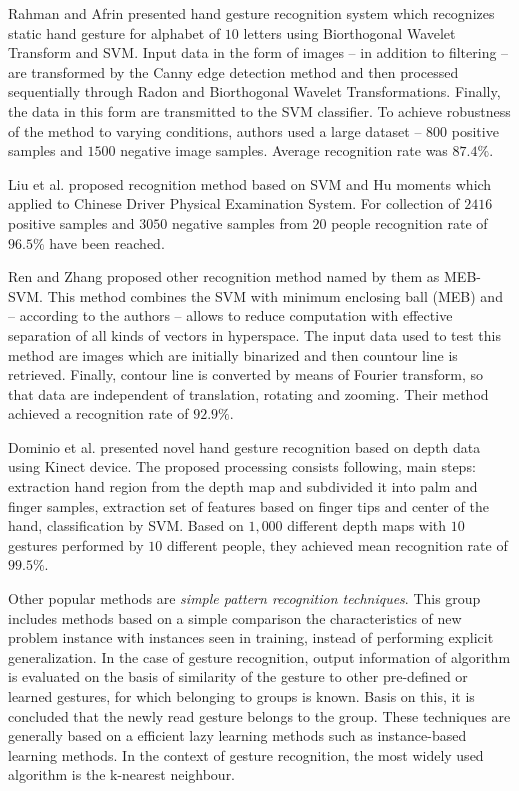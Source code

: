 Rahman and Afrin \cite{RahmanHand} presented hand gesture recognition system which recognizes static hand gesture for alphabet of $10$ letters using Biorthogonal Wavelet Transform and SVM. Input data in the form of images -- in addition to filtering -- are transformed by the Canny edge detection method and then processed sequentially through Radon and Biorthogonal Wavelet Transformations. Finally, the data in this form are transmitted to the SVM classifier. To achieve robustness of the method to varying conditions, authors used a large dataset -- $800$ positive samples and $1500$ negative image samples. Average recognition rate was $87.4\%$.

Liu et al. \cite{LiuStatic} proposed recognition method based on SVM and Hu moments which applied to Chinese Driver Physical Examination System. For collection of $2416$ positive samples and $3050$ negative samples from $20$ people recognition rate of $96.5\%$ have been reached.

Ren and Zhang \cite{RenMEBSVM} proposed other recognition method named by them as MEB-SVM. This method combines the SVM with minimum enclosing ball (MEB) and -- according to the authors -- allows to reduce computation with effective separation of all kinds of vectors in hyperspace. The input data used to test this method are images which are initially binarized and then countour line is retrieved. Finally, contour line is converted by means of Fourier transform, so that data are independent of translation, rotating and zooming. Their method achieved a recognition rate of $92.9\%$.


Dominio et al. \cite{Dominio:2013:HGR:2510650.2510651} presented novel hand gesture recognition based on depth data using Kinect device. The proposed processing consists following, main steps: extraction hand region from the depth map and subdivided it into palm and finger samples, extraction set of features based on finger tips and center of the hand, classification by SVM. Based on $1,000$ different depth maps with $10$ gestures performed by $10$ different people, they achieved mean recognition rate of $99.5\%$.

Other popular methods are \emph{simple pattern recognition techniques}. This group includes methods based on a simple comparison the characteristics of new problem instance with instances seen in training, instead of performing explicit generalization. In the case of gesture recognition, output information of algorithm is evaluated on the basis of similarity of the gesture to other pre-defined or learned gestures, for which belonging to groups is known. Basis on this, it is concluded that the newly read gesture belongs to the group. These techniques are generally based on a efficient lazy learning methods such as instance-based learning methods.  In the context of gesture recognition, the most widely used algorithm is the k-nearest neighbour.

